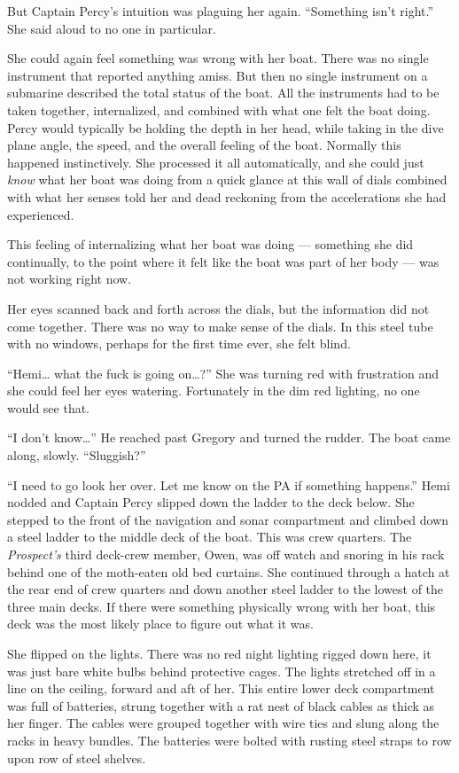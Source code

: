 \documentclass[]{article}
\begin{document}
\begin{multicols}{2}
But Captain Percy's intuition was plaguing her again. ``Something isn't
right.'' She said aloud to no one in particular.

She could again feel something was wrong with her boat. There was no
single instrument that reported anything amiss. But then no single
instrument on a submarine described the total status of the boat. All
the instruments had to be taken together, internalized, and combined
with what one felt the boat doing. Percy would typically be holding the
depth in her head, while taking in the dive plane angle, the speed, and
the overall feeling of the boat. Normally this happened instinctively.
She processed it all automatically, and she could just \emph{know} what
her boat was doing from a quick glance at this wall of dials combined
with what her senses told her and dead reckoning from the accelerations
she had experienced.

This feeling of internalizing what her boat was doing --- something she
did continually, to the point where it felt like the boat was part of
her body --- was not working right now.

Her eyes scanned back and forth across the dials, but the information
did not come together. There was no way to make sense of the dials. In
this steel tube with no windows, perhaps for the first time ever, she
felt blind.

``Hemi\ldots{} what the fuck is going on\ldots{}?'' She was turning red
with frustration and she could feel her eyes watering. Fortunately in
the dim red lighting, no one would see that.

``I don't know\ldots{}'' He reached past Gregory and turned the rudder.
The boat came along, slowly. ``Sluggish?''

``I need to go look her over. Let me know on the PA if something
happens.'' Hemi nodded and Captain Percy slipped down the ladder to the
deck below. She stepped to the front of the navigation and sonar
compartment and climbed down a steel ladder to the middle deck of the
boat. This was crew quarters. The \emph{Prospect's} third deck-crew
member, Owen, was off watch and snoring in his rack behind one of the
moth-eaten old bed curtains. She continued through a hatch at the rear
end of crew quarters and down another steel ladder to the lowest of the
three main decks. If there were something physically wrong with her
boat, this deck was the most likely place to figure out what it was.

She flipped on the lights. There was no red night lighting rigged down
here, it was just bare white bulbs behind protective cages. The lights
stretched off in a line on the ceiling, forward and aft of her. This
entire lower deck compartment was full of batteries, strung together
with a rat nest of black cables as thick as her finger. The cables were
grouped together with wire ties and slung along the racks in heavy
bundles. The batteries were bolted with rusting steel straps to row upon
row of steel shelves.


\end{multicols}
\end{document}
